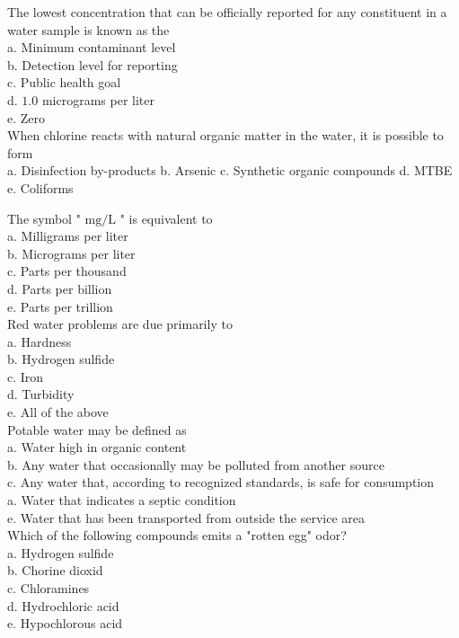 The lowest concentration that can be officially reported for any constituent in a water sample is known as the\\
a. Minimum contaminant level\\
b. Detection level for reporting\\
c. Public health goal\\
d.  $1.0$ micrograms per liter\\
e. Zero\\

When chlorine reacts with natural organic matter in the water, it is possible to form\\
a. Disinfection by-products
b. Arsenic
c. Synthetic organic compounds
d. MTBE
e. Coliforms


The symbol " $\mathrm{mg} / \mathrm{L}$ " is equivalent to\\
a.  Milligrams per liter\\
b. Micrograms per liter\\
c. Parts per thousand\\
d. Parts per billion\\
e. Parts per trillion\\

Red water problems are due primarily to\\
a. Hardness\\
b. Hydrogen sulfide\\
c.  Iron\\
d. Turbidity\\
e. All of the above\\

Potable water may be defined as\\
a. Water high in organic content\\
b. Any water that occasionally may be polluted from another source\\
c.  Any water that, according to recognized standards, is safe for consumption\\
a. Water that indicates a septic condition\\
e. Water that has been transported from outside the service area\\

Which of the following compounds emits a "rotten egg" odor?\\
a.  Hydrogen sulfide\\
b. Chorine dioxid\\
c. Chloramines\\
d. Hydrochloric acid\\
e. Hypochlorous acid\\

